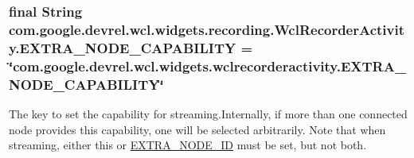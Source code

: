 \subsubsection[{\texorpdfstring{E\+X\+T\+R\+A\+\_\+\+N\+O\+D\+E\+\_\+\+C\+A\+P\+A\+B\+I\+L\+I\+TY}{EXTRA_NODE_CAPABILITY}}]{\setlength{\rightskip}{0pt plus 5cm}final String com.\+google.\+devrel.\+wcl.\+widgets.\+recording.\+Wcl\+Recorder\+Activity.\+E\+X\+T\+R\+A\+\_\+\+N\+O\+D\+E\+\_\+\+C\+A\+P\+A\+B\+I\+L\+I\+TY = \char`\"{}com.\+google.\+devrel.\+wcl.\+widgets.\+wclrecorderactivity.\+E\+X\+T\+R\+A\+\_\+\+N\+O\+D\+E\+\_\+\+C\+A\+P\+A\+B\+I\+L\+I\+TY\char`\"{}\hspace{0.3cm}{\ttfamily [static]}}\hypertarget{classcom_1_1google_1_1devrel_1_1wcl_1_1widgets_1_1recording_1_1WclRecorderActivity_a7bd0e0e31dfd9a6a1378bc5998470e65}{}\label{classcom_1_1google_1_1devrel_1_1wcl_1_1widgets_1_1recording_1_1WclRecorderActivity_a7bd0e0e31dfd9a6a1378bc5998470e65}
The key to set the capability for streaming.\+Internally, if more than one connected node provides this capability, one will be selected arbitrarily. Note that when streaming, either this or \hyperlink{classcom_1_1google_1_1devrel_1_1wcl_1_1widgets_1_1recording_1_1WclRecorderActivity_af9724d687c9bc9c09865a162767767a0}{E\+X\+T\+R\+A\+\_\+\+N\+O\+D\+E\+\_\+\+ID} must be set, but not both. 
